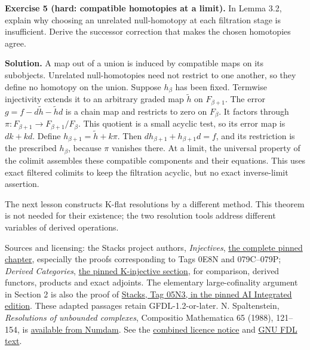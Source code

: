 \documentclass[
  english,
  11pt,
  a4paper,
]{article}
\begin{document}
\textbf{Exercise 5 (hard: compatible homotopies at a limit).} In Lemma
3.2, explain why choosing an unrelated null-homotopy at each filtration
stage is insufficient. Derive the successor correction that makes the
chosen homotopies agree.

\textbf{Solution.} A map out of a union is induced by compatible maps on
its subobjects. Unrelated null-homotopies need not restrict to one
another, so they define no homotopy on the union. Suppose \(h_\beta\)
has been fixed. Termwise injectivity extends it to an arbitrary graded
map \(\widetilde h\) on \(F_{\beta+1}\). The error
\(g=f-d\widetilde h-\widetilde h d\) is a chain map and restricts to
zero on \(F_\beta\). It factors through
\(\pi:F_{\beta+1}\to F_{\beta+1}/F_\beta\). This quotient is a small
acyclic test, so its error map is \(dk+kd\). Define
\(h_{\beta+1}=\widetilde h+k\pi\). Then \(dh_{\beta+1}+h_{\beta+1}d=f\),
and its restriction is the prescribed \(h_\beta\), because \(\pi\)
vanishes there. At a limit, the universal property of the colimit
assembles these compatible components and their equations. This uses
exact filtered colimits to keep the filtration acyclic, but no exact
inverse-limit assertion.

The next lesson constructs K-flat resolutions by a different method.
This theorem is not needed for their existence; the two resolution tools
address different variables of derived operations.

Sources and licensing: the Stacks project authors, \emph{Injectives},
\href{https://github.com/KokunoYumeto/unofficial-stacks-project-ai-drafts/blob/565b10e987aba5969b21145a0833f42d69f96790/injectives.tex}{the
complete pinned chapter}, especially the proofs corresponding to Tags
0E8N and 079C--079P; \emph{Derived Categories},
\href{https://github.com/KokunoYumeto/unofficial-stacks-project-ai-drafts/blob/565b10e987aba5969b21145a0833f42d69f96790/derived.tex\#L9967}{the
pinned K-injective section}, for comparison, derived functors, products
and exact adjoints. The elementary large-cofinality argument in Section
2 is also the proof of
\href{https://github.com/KokunoYumeto/unofficial-stacks-project-ai-drafts/blob/565b10e987aba5969b21145a0833f42d69f96790/sets.tex\#L217}{Stacks,
Tag 05N3, in the pinned AI Integrated edition}. These adapted passages
retain GFDL-1.2-or-later. N. Spaltenstein, \emph{Resolutions of
unbounded complexes}, Compositio Mathematica 65 (1988), 121--154, is
\href{https://www.numdam.org/item/CM_1988__65_2_121_0/}{available from
Numdam}. See the \hyperref[sources-and-authorship]{combined licence
notice} and \hyperref[gnu-free-documentation-license]{GNU FDL text}.
\end{document}
